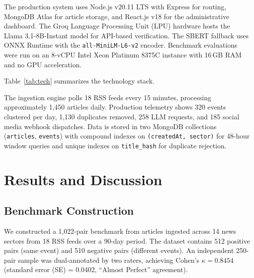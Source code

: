 \documentclass[conference]{IEEEtran}
\begin{document}
The production system uses Node.js v20.11 LTS with Express for routing, MongoDB Atlas for article storage, and React.js v18 for the administrative dashboard.
The Groq Language Processing Unit (LPU) hardware hosts the Llama 3.1-8B-Instant model for API-based verification.
The SBERT fallback uses ONNX Runtime with the \texttt{all-MiniLM-L6-v2} encoder.
Benchmark evaluations were run on an 8-vCPU Intel Xeon Platinum 8375C instance with 16\,GB RAM and no GPU acceleration.

Table~\ref{tab:tech} summarizes the technology stack.

\begin{table}[!t]
\centering
\caption{Development Environment and Technologies}
\label{tab:tech}
\end{table}

The ingestion engine polls 18 RSS feeds every 15 minutes, processing approximately 1,450 articles daily.
Production telemetry shows 320 events clustered per day, 1,130 duplicates removed, 258 LLM requests, and 185 social media webhook dispatches.
Data is stored in two MongoDB collections (\texttt{articles}, \texttt{events}) with compound indexes on \texttt{(createdAt, sector)} for 48-hour window queries and unique indexes on \texttt{title\_hash} for duplicate rejection.

\section{Results and Discussion}

\subsection{Benchmark Construction}
We constructed a 1,022-pair benchmark from articles ingested across 14 news sectors from 18 RSS feeds over a 90-day period.
The dataset contains 512 positive pairs (same event) and 510 negative pairs (different events).
An independent 250-pair sample was dual-annotated by two raters, achieving Cohen's $\kappa = 0.8454$ (standard error (SE) = 0.0402, ``Almost Perfect'' agreement).
\end{document}
